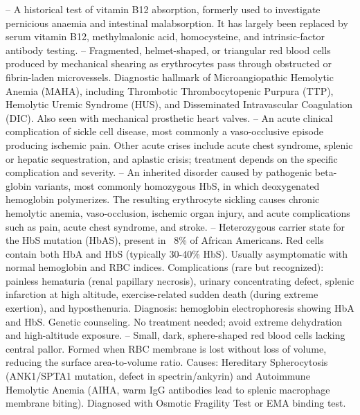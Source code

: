 -- A historical test of vitamin B12 absorption, formerly used to investigate pernicious anaemia and intestinal malabsorption. It has largely been replaced by serum vitamin B12, methylmalonic acid, homocysteine, and intrinsic-factor antibody testing.
-- Fragmented, helmet-shaped, or triangular red blood cells produced by mechanical shearing as erythrocytes pass through obstructed or fibrin-laden microvessels. Diagnostic hallmark of Microangiopathic Hemolytic Anemia (MAHA), including Thrombotic Thrombocytopenic Purpura (TTP), Hemolytic Uremic Syndrome (HUS), and Disseminated Intravascular Coagulation (DIC). Also seen with mechanical prosthetic heart valves.
-- An acute clinical complication of sickle cell disease, most commonly a vaso-occlusive episode producing ischemic pain. Other acute crises include acute chest syndrome, splenic or hepatic sequestration, and aplastic crisis; treatment depends on the specific complication and severity.
-- An inherited disorder caused by pathogenic beta-globin variants, most commonly homozygous HbS, in which deoxygenated hemoglobin polymerizes. The resulting erythrocyte sickling causes chronic hemolytic anemia, vaso-occlusion, ischemic organ injury, and acute complications such as pain, acute chest syndrome, and stroke.
-- Heterozygous carrier state for the HbS mutation (HbAS), present in ~8\% of African Americans. Red cells contain both HbA and HbS (typically 30-40\% HbS). Usually asymptomatic with normal hemoglobin and RBC indices. Complications (rare but recognized): painless hematuria (renal papillary necrosis), urinary concentrating defect, splenic infarction at high altitude, exercise-related sudden death (during extreme exertion), and hyposthenuria. Diagnosis: hemoglobin electrophoresis showing HbA and HbS. Genetic counseling. No treatment needed; avoid extreme dehydration and high-altitude exposure.
-- Small, dark, sphere-shaped red blood cells lacking central pallor. Formed when RBC membrane is lost without loss of volume, reducing the surface area-to-volume ratio. Causes: Hereditary Spherocytosis (ANK1/SPTA1 mutation, defect in spectrin/ankyrin) and Autoimmune Hemolytic Anemia (AIHA, warm IgG antibodies lead to splenic macrophage membrane biting). Diagnosed with Osmotic Fragility Test or EMA binding test.
